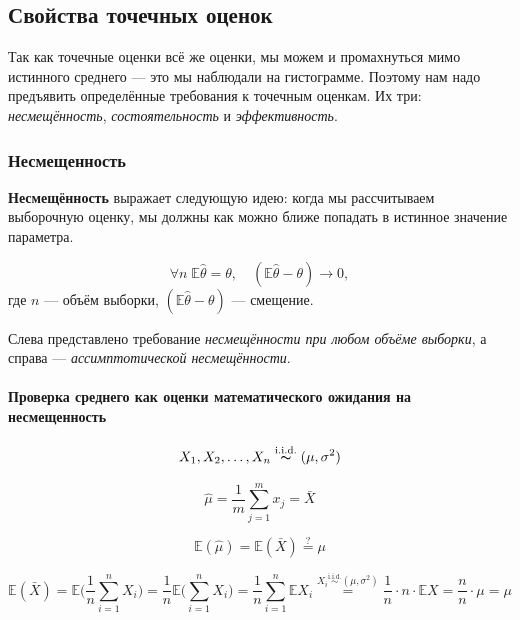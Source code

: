 \documentclass[
  letterpaper,
  DIV=11,
  numbers=noendperiod]{scrreprt}
\let\oldparagraph\paragraph
\renewcommand{\paragraph}[1]{\oldparagraph{#1}\mbox{}}
\newcommand{\expect}{\mathbb{E}}
\newcommand{\iid}{\text{i.i.d.}}
\theoremstyle{definition}
\theoremstyle{remark}
\begin{document}
\subsection{Свойства точечных
оценок}\label{ux441ux432ux43eux439ux441ux442ux432ux430-ux442ux43eux447ux435ux447ux43dux44bux445-ux43eux446ux435ux43dux43eux43a}

Так как точечные оценки всё же оценки, мы можем и промахнуться мимо
истинного среднего --- это мы наблюдали на гистограмме. Поэтому нам надо
предъявить определённые требования к точечным оценкам. Их три:
\emph{несмещённость}, \emph{состоятельность} и \emph{эффективность}.

\subsubsection{Несмещенность}\label{ux43dux435ux441ux43cux435ux449ux435ux43dux43dux43eux441ux442ux44c}

\textbf{Несмещённость} выражает следующую идею: когда мы рассчитываем
выборочную оценку, мы должны как можно ближе попадать в истинное
значение параметра.

\[
\forall n \; \mathbb{E} \hat \theta = \theta, \quad (\mathbb{E}\hat \theta - \theta) \rightarrow 0,
\] где \(n\) --- объём выборки, \((\mathbb{E}\hat \theta - \theta)\) ---
смещение.

Слева представлено требование \emph{несмещённости при любом объёме
выборки}, а справа --- \emph{ассимптотической несмещённости}.

\paragraph{Проверка среднего как оценки математического ожидания на
несмещенность}\label{ux43fux440ux43eux432ux435ux440ux43aux430-ux441ux440ux435ux434ux43dux435ux433ux43e-ux43aux430ux43a-ux43eux446ux435ux43dux43aux438-ux43cux430ux442ux435ux43cux430ux442ux438ux447ux435ux441ux43aux43eux433ux43e-ux43eux436ux438ux434ux430ux43dux438ux44f-ux43dux430-ux43dux435ux441ux43cux435ux449ux435ux43dux43dux43eux441ux442ux44c}

\[ 
X_1, X_2, \dots , X_n \overset{\iid}{\thicksim} (\mu, \sigma^2)
\]

\[
\hat \mu = \frac{1}{m}\sum_{j=1}^m x_j = \bar X 
\]

\[
\expect (\hat \mu) = \expect (\bar X) \overset{?}{=} \mu
\]

\[
\expect (\bar X) = \expect \big (\frac{1}{n} \sum_{i=1}^n X_i \big ) = \frac{1}{n} \expect \Big( \sum_{i=1}^n X_i \Big) = \frac{1}{n} \sum_{i=1}^n \expect X_i \overset{X_i \overset{\iid}{\sim} (\mu, \sigma^2)}{=} \frac{1}{n} \cdot n \cdot \expect X = \frac{n}{n} \cdot \mu = \mu
\]
\end{document}
